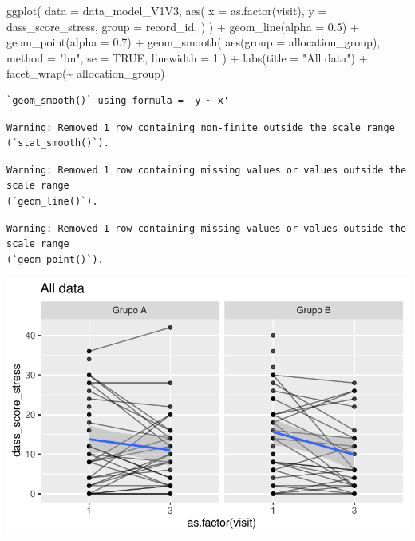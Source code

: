 \documentclass[
  letterpaper,
  DIV=11,
  numbers=noendperiod]{scrartcl}
\newenvironment{Shaded}{\begin{snugshade}}{\end{snugshade}}
\newcommand{\AttributeTok}[1]{\textcolor[rgb]{0.40,0.45,0.13}{#1}}
\newcommand{\ConstantTok}[1]{\textcolor[rgb]{0.56,0.35,0.01}{#1}}
\newcommand{\DecValTok}[1]{\textcolor[rgb]{0.68,0.00,0.00}{#1}}
\newcommand{\FloatTok}[1]{\textcolor[rgb]{0.68,0.00,0.00}{#1}}
\newcommand{\FunctionTok}[1]{\textcolor[rgb]{0.28,0.35,0.67}{#1}}
\newcommand{\NormalTok}[1]{\textcolor[rgb]{0.00,0.23,0.31}{#1}}
\newcommand{\SpecialCharTok}[1]{\textcolor[rgb]{0.37,0.37,0.37}{#1}}
\newcommand{\StringTok}[1]{\textcolor[rgb]{0.13,0.47,0.30}{#1}}
\begin{document}
\begin{Shaded}
\begin{Highlighting}[]
\FunctionTok{ggplot}\NormalTok{(}
    \AttributeTok{data =}\NormalTok{ data\_model\_V1V3, }
    \FunctionTok{aes}\NormalTok{(}
        \AttributeTok{x =} \FunctionTok{as.factor}\NormalTok{(visit),}
        \AttributeTok{y =}\NormalTok{ dass\_score\_stress,}
        \AttributeTok{group =}\NormalTok{ record\_id,}
\NormalTok{    )}
\NormalTok{) }\SpecialCharTok{+}
    \FunctionTok{geom\_line}\NormalTok{(}\AttributeTok{alpha =} \FloatTok{0.5}\NormalTok{) }\SpecialCharTok{+}
    \FunctionTok{geom\_point}\NormalTok{(}\AttributeTok{alpha =} \FloatTok{0.7}\NormalTok{) }\SpecialCharTok{+}
    \FunctionTok{geom\_smooth}\NormalTok{(}
        \FunctionTok{aes}\NormalTok{(}\AttributeTok{group =}\NormalTok{ allocation\_group),}
        \AttributeTok{method =} \StringTok{"lm"}\NormalTok{,}
        \AttributeTok{se =} \ConstantTok{TRUE}\NormalTok{,}
        \AttributeTok{linewidth =} \DecValTok{1}
\NormalTok{    ) }\SpecialCharTok{+}
    \FunctionTok{labs}\NormalTok{(}\AttributeTok{title =} \StringTok{"All data"}\NormalTok{) }\SpecialCharTok{+}
    \FunctionTok{facet\_wrap}\NormalTok{(}\SpecialCharTok{\textasciitilde{}}\NormalTok{ allocation\_group)}
\end{Highlighting}
\end{Shaded}

\begin{verbatim}
`geom_smooth()` using formula = 'y ~ x'
\end{verbatim}

\begin{verbatim}
Warning: Removed 1 row containing non-finite outside the scale range
(`stat_smooth()`).
\end{verbatim}

\begin{verbatim}
Warning: Removed 1 row containing missing values or values outside the scale range
(`geom_line()`).
\end{verbatim}

\begin{verbatim}
Warning: Removed 1 row containing missing values or values outside the scale range
(`geom_point()`).
\end{verbatim}

\includegraphics{Outcomes_V1V2V3_files/figure-pdf/dass_score_stress_6-1.pdf}
\end{document}
